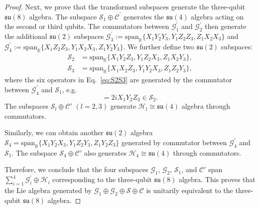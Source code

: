 \documentclass[aps,showpacs,amsmath,amssymb,twocolumn,prx,longbibliography,superscriptaddress,notitlepage,floatfix,10pt]{revtex4-2}
\begin{document}
\begin{proof}
Next, we prove that the transformed subspaces generate the three-qubit $\mathfrak{su}(8)$ algebra. The subspace $\mathcal{S}_{1}\oplus\mathcal{C}^{\prime}$ generates the $\mathfrak{su}(4)$ algebra acting on the second or third qubits. The commutators between $\mathcal{G}_{1}^{\prime}$ and $\mathcal{G}_{2}^{\prime}$ then generate the additional $\mathfrak{su}(2)$ subspaces $\mathcal{G}_{3}^{\prime}:=\mathrm{span}_{\mathbb{R}}\{X_{1}Y_{2}Y_{3},Y_{1}Z_{2}Z_{3},Z_{1}X_{2}X_{3}\}$ and $\mathcal{G}_{4}^{\prime}:=\mathrm{span}_{\mathbb{R}}\{X_{1}Z_{2}Z_{3},Y_{1}X_{2}X_{3},Z_{1}Y_{2}Y_{3}\}$. We further define two $\mathfrak{su}(2)$ subspaces:
    \begin{equation}
    \begin{split}
        \mathcal{S}_{2}&=\mathrm{span}_{\mathbb{R}}\{X_{1}Y_{2}Z_{3},Y_{1}Z_{2}X_{3},Z_{1}X_{2}Y_{3}\},\\
        \mathcal{S}_{3}&=\mathrm{span}_{\mathbb{R}}\{X_{1}X_{2}Z_{3},Y_{1}Y_{2}X_{3},Z_{1}Z_{2}Y_{3}\},
    \end{split}
    \label{eq:S2S3}
    \end{equation}
    where the six operators in Eq.~\eqref{eq:S2S3} are generated by the commutator between $\mathcal{G}_{4}^{\prime}$ and $\mathcal{S}_{1}$, e.g.
    \begin{equation}
    [X_{1}Z_{2}Z_{3},X_{2}]=2iX_{1}Y_{2}Z_{3}\in\mathcal{S}_{2}.    
    \end{equation} 
    The subspaces $\mathcal{S}_l\oplus\mathcal{C}'$ $(l=2,3)$ generate $\mathcal{H}_{l}\cong\mathfrak{su}(4)$ algebra through commutators. 
    
    Similarly, we can obtain another $\mathfrak{su}(2)$ algebra $\mathcal{S}_{4}=\mathrm{span}_{\mathbb{R}}\{X_{1}Y_{2}X_{3},Y_{1}Z_{2}Y_{3},Z_{1}Y_{2}Z_{3}\}$ generated by commutator between $\mathcal{G}_{4}^{\prime}$ and $\mathcal{S}_{1}$. The subspace $\mathcal{S}_4\oplus\mathcal{C}'$ also generates $\mathcal{H}_{4}\cong\mathfrak{su}(4)$ through commutators.
    
    Therefore, we conclude that the four subspaces $\mathcal{G}_{1}$, $\mathcal{G}_{2}$, $\mathcal{S}_{1}$, and $\mathcal{C}'$ span $\sum_{i=1}^{4}\mathcal{G}_{i}^{\prime}\oplus\mathcal{H}_{i}$ corresponding to the three-qubit $\mathfrak{su}(8)$ algebra. This proves that the Lie algebra generated by $\mathcal{G}_{1}\oplus\mathcal{G}_{2}\oplus\mathcal{S}\oplus\mathcal{C}$ is unitarily equivalent to the three-qubit $\mathfrak{su}(8)$ algebra.
\end{proof}
\end{document}
